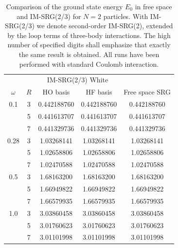 \begin{table}
\begin{center}
\begin{tabular}{ccccc}
\hline\hline
 & & \multicolumn{2}{c}{IM-SRG(2/3) White} & \\
$\omega$ & $R$ & HO basis & HF basis & Free space SRG \\
\hline
0.1 & 3 &0.442188760 &0.442188760&0.442188760  \\
& 5 & 0.441613707 &0.441613707& 0.441613707\\
& 7 &0.441329736 & 0.441329736 & 0.441329736\\
\hline
0.28 & 3&1.03268141 &1.03268141 &1.03268141 \\
& 5&1.02658806 &1.02658806 & 1.02658806\\
& 7&1.02470588 & 1.02470588 & 1.02470588 \\
\hline
0.5&3 &1.68163200 &1.68163200 &1.68163200 \\
& 5&1.66949822 &1.66949822 &1.66949822 \\
& 7&1.66579935 &1.66579935 &1.66579935 \\
\hline
1.0 & 3&3.03860458 &3.03860458 &3.03860458 \\
& 5 &3.01760623 &3.01760623& 3.01760623\\
& 7 &3.01101998 &3.01101998& 3.01101998\\
\hline\hline
\end{tabular}
\caption{Comparison of the ground state energy $E_0$ in free space and IM-SRG(2/3) for $N=2$ particles. With IM-SRG(2/3) we denote second-order IM-SRG(2), extended by the loop terms of three-body interactions. The high number of specified digits shall emphasize that exactly the same result is obtained. All runs have been performed with standard Coulomb interaction.}
\label{tab:CompIMWhite}
\end{center}
\end{table}

